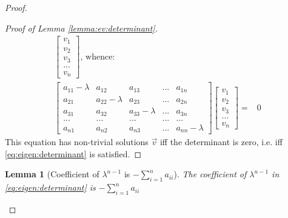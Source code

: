 \documentclass[]{article}
\newtheorem{lemma}[thm]{Lemma}
\begin{document}
\begin{proof}
\begin{proof}[Proof of Lemma \ref{lemma:ev:determinant}]
\begin{align*}
\begin{bmatrix}
				v_1\\
				v_2\\
				v_3\\
				...\\
				v_n
			\end{bmatrix} \text{, whence:} \\
			\begin{bmatrix}
				a_{11}-\lambda&a_{12}&a_{13}&...&a_{1n}\\
				a_{21}&a_{22}-\lambda&a_{23}&...&a_{2n}\\
				a_{31}&a_{32}&a_{33}-\lambda&...&a_{3n}\\
				...&...&...&...&...\\
				a_{n1}&a_{n2}&a_{n3}&...&a_{nn}-\lambda
			\end{bmatrix}\begin{bmatrix}
				v_1\\
				v_2\\
				v_3\\
				...\\
				v_n
			\end{bmatrix}=&0
		\end{align*}
	This equation has non-trivial solutions $\vec{v}$ iff the determinant is zero, i.e. iff \eqref{eq:eigen:determinant} is satisfied.
	\end{proof}		
	\begin{lemma}[Coefficient of $\lambda^{n-1}$ is $-\sum_{i=1}^{n} a_{ii}$]\label{lemma:coeff:sum}
		The coefficient of $\lambda^{n-1}$  in \eqref{eq:eigen:determinant} is $-\sum_{i=1}^{n} a_{ii}$
	\end{lemma}


\end{proof}
\end{document}

